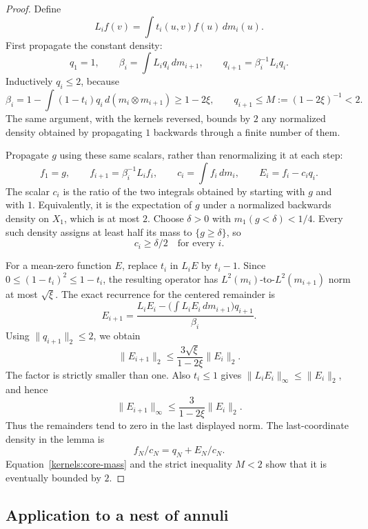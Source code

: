 \begin{proof}
Define
\[
 L_i f(v)=\int t_i(u,v)f(u)\,dm_i(u).
\]
First propagate the constant density:
\[
 q_1=1,\qquad
 \beta_i=\int L_iq_i\,dm_{i+1},\qquad
 q_{i+1}=\beta_i^{-1}L_iq_i.
\]
Inductively \(q_i\le2\), because
\[
 \beta_i
  =1-\int(1-t_i)q_i\,d(m_i\otimes m_{i+1})
  \ge1-2\xi,\qquad
 q_{i+1}\le M:=(1-2\xi)^{-1}<2.
\]
The same argument, with the kernels reversed, bounds by \(2\) any
normalized density obtained by propagating \(1\) backwards through
a finite number of them.

Propagate \(g\) using these same scalars, rather than renormalizing
it at each step:
\[
 f_1=g,\qquad f_{i+1}=\beta_i^{-1}L_if_i,\qquad
 c_i=\int f_i\,dm_i,\qquad E_i=f_i-c_iq_i.
\]
The scalar \(c_i\) is the ratio of the two integrals obtained by
starting with \(g\) and with \(1\). Equivalently, it is the
expectation of \(g\) under a normalized backwards density on
\(X_1\), which is at most \(2\). Choose \(\delta>0\) with
\(m_1(g<\delta)<1/4\). Every such density assigns at least half
its mass to \(\{g\ge\delta\}\), so
\begin{equation}\label{kernels:core-mass}
                         c_i\ge\delta/2
                    \quad\text{for every }i.
\end{equation}

For a mean-zero function \(E\), replace \(t_i\) in \(L_iE\) by
\(t_i-1\). Since \(0\le(1-t_i)^2\le1-t_i\), the resulting
operator has \(L^2(m_i)\)-to-\(L^2(m_{i+1})\) norm at most
\(\sqrt\xi\). The exact recurrence for the centered remainder is
\[
 E_{i+1}
 =\frac{L_iE_i-\bigl(\int L_iE_i\,dm_{i+1}\bigr)q_{i+1}}
        {\beta_i}.
\]
Using \(\|q_{i+1}\|_2\le2\), we obtain
\begin{equation}\label{kernels:contraction}
 \|E_{i+1}\|_2
 \le\frac{3\sqrt\xi}{1-2\xi}\|E_i\|_2.
\end{equation}
The factor is strictly smaller than one. Also \(t_i\le1\) gives
\(\|L_iE_i\|_\infty\le\|E_i\|_2\), and hence
\[
 \|E_{i+1}\|_\infty
       \le\frac{3}{1-2\xi}\|E_i\|_2.
\]
Thus the remainders tend to zero in the last displayed norm.
The last-coordinate density in the lemma is
\[
                    f_N/c_N=q_N+E_N/c_N.
\]
Equation~\eqref{kernels:core-mass} and the strict inequality
\(M<2\) show that it is eventually bounded by \(2\).
\end{proof}

\subsection{Application to a nest of annuli}

